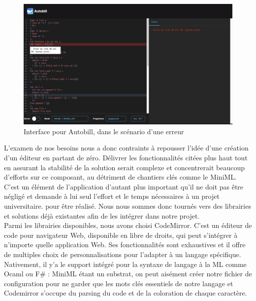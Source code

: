 \documentclass[12pt]{article}
\begin{document}
\begin{figure}
      \centering
      \includegraphics[scale=0.36]{Figures/screen.png}
      \caption{Interface pour Autobill, dans le scénario d'une erreur}
\end{figure}
L'examen de nos besoins nous a donc contraints à repousser l'idée d'une création d'un éditeur en partant de zéro. Délivrer les fonctionnalités citées plus haut tout en assurant la stabilité de la solution serait complexe et concentrerait beaucoup d'efforts sur ce composant, au détriment de chantiers clés comme le MiniML. C'est un élément de l'application d'autant plus important qu'il ne doit pas être négligé et demande à lui seul l'effort et le temps nécessaires à un projet universitaire. pour être réalisé. Nous nous sommes donc tournés vers des librairies et solutions déjà existantes afin de les intégrer dans notre projet. \\

Parmi les librairies disponibles, nous avons choisi CodeMirror. C'est un éditeur de code pour navigateur Web, disponible en libre de droits, qui peut s'intégrer à n'importe quelle application Web. Ses fonctionnalités sont exhaustives et il offre de multiples choix de personnalisations pour l'adapter à un langage spécifique. Nativement, il y'a le support intégré pour la syntaxe de langage à la ML comme Ocaml ou F\# : MiniML étant un substrat, on peut aisément créer notre fichier de configuration pour ne garder que les mots clés essentiels de notre langage et Codemirror s'occupe du parsing du code et de la coloration de chaque caractère. \\
\end{document}
